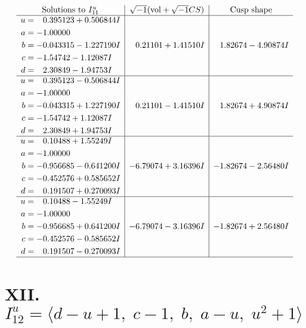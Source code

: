 \documentclass[1p]{elsarticle_modified}
\theoremstyle{definition}
\newcommand{\I}{\sqrt{-1}}
\begin{document}
$$\begin{array}{c|c|c}  
\text{Solutions to }I^u_{11}& \I (\text{vol} + \sqrt{-1}CS) & \text{Cusp shape}\\
 \hline 
\begin{aligned}
u &= \phantom{-}0.395123 + 0.506844 I \\
a &= -1.00000\phantom{ +0.000000I} \\
b &= -0.043315 - 1.227190 I \\
c &= -1.54742 - 1.12087 I \\
d &= \phantom{-}2.30849 - 1.94753 I\end{aligned}
 & \phantom{-}0.21101 + 1.41510 I & \phantom{-}1.82674 - 4.90874 I \\ \hline\begin{aligned}
u &= \phantom{-}0.395123 - 0.506844 I \\
a &= -1.00000\phantom{ +0.000000I} \\
b &= -0.043315 + 1.227190 I \\
c &= -1.54742 + 1.12087 I \\
d &= \phantom{-}2.30849 + 1.94753 I\end{aligned}
 & \phantom{-}0.21101 - 1.41510 I & \phantom{-}1.82674 + 4.90874 I \\ \hline\begin{aligned}
u &= \phantom{-}0.10488 + 1.55249 I \\
a &= -1.00000\phantom{ +0.000000I} \\
b &= -0.956685 - 0.641200 I \\
c &= -0.452576 + 0.585652 I \\
d &= \phantom{-}0.191507 + 0.270093 I\end{aligned}
 & -6.79074 + 3.16396 I & -1.82674 - 2.56480 I \\ \hline\begin{aligned}
u &= \phantom{-}0.10488 - 1.55249 I \\
a &= -1.00000\phantom{ +0.000000I} \\
b &= -0.956685 + 0.641200 I \\
c &= -0.452576 - 0.585652 I \\
d &= \phantom{-}0.191507 - 0.270093 I\end{aligned}
 & -6.79074 - 3.16396 I & -1.82674 + 2.56480 I\\
 \hline 
 \end{array}$$\newpage\newpage\renewcommand{\arraystretch}{1}
\centering \section*{XII. $I^u_{12}= \langle d- u+1,\;c-1,\;b,\;a- u,\;u^2+1 \rangle$}
\end{document}
